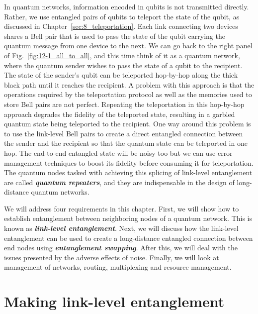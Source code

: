 In quantum networks, information encoded in qubits is not transmitted directly.
Rather, we use entangled pairs of qubits to teleport the state of the qubit, as discussed in Chapter~\ref{sec:8_teleportation}.
Each link connecting two devices shares a Bell pair that is used to pass the state of the qubit carrying the quantum message from one device to the next.
We can go back to the right panel of Fig.~\ref{fig:12-1_all_to_all}, and this time think of it as a quantum network, where the quantum sender wishes to pass the state of a qubit to the recipient.
The state of the sender's qubit can be teleported hop-by-hop along the thick black path until it reaches the recipient.
A problem with this approach is that the operations required by the teleportation protocol as well as the memories used to store Bell pairs are not perfect.
Repeating the teleportation in this hop-by-hop approach degrades the fidelity of the teleported state, resulting in a garbled quantum state being teleported to the recipient.
One way around this problem is to use the link-level Bell pairs to create a direct entangled connection between the sender and the recipient so that the quantum state can be teleported in one hop.
The end-to-end entangled state will be noisy too but we can use error management techniques to boost its fidelity before consuming it for teleportation.
The quantum nodes tasked with achieving this splicing of link-level entanglement are called \emph{\textbf{quantum repeaters}}, and they are indispensable in the design of long-distance quantum networks.

We will address four requirements in this chapter.
First, we will show how to establish entanglement between neighboring nodes of a quantum network.
This is known as \textbf{\emph{link-level entanglement}}.
Next, we will discuss how the link-level entanglement can be used to create a long-distance entangled connection between end nodes using \textbf{\emph{entanglement swapping}}.
After this, we will deal with the issues presented by the adverse effects of noise.
Finally, we will look at management of networks, routing, multiplexing and resource management.


\section{Making link-level entanglement}
\label{sec:12-2_making_link_level_rantanglement}

